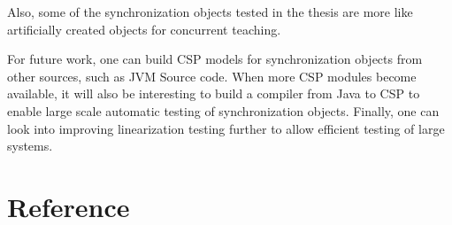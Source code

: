 \documentclass[a4paper, 12pt]{article}
\begin{document}
Also, some of the synchronization objects tested in the thesis are more like artificially created objects for concurrent teaching. 

For future work, one can build CSP models for synchronization objects from other sources, such as JVM Source code. When more CSP modules become available, it will also be interesting to build a compiler from Java to CSP to enable large scale automatic testing of synchronization objects. Finally, one can look into improving linearization testing further to allow efficient testing of large systems. 

\newpage
\section{Reference}



%
\end{document}
